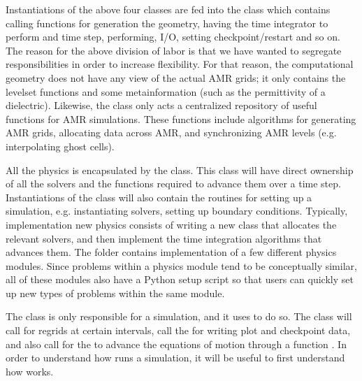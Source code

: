 \documentclass[letterpaper,10pt,english]{sphinxmanual}
\begin{document}
Instantiations of the above four classes are fed into the {\hyperref[\detokenize{Driver:chap-driver}]{}} class which contains calling functions for generation the geometry, having the time integrator to perform and time step, performing, I/O, setting checkpoint/restart and so on.
The reason for the above division of labor is that we have wanted to segregate responsibilities in order to increase flexibility.
For that reason, the computational geometry does not have any view of the actual AMR grids; it only contains the level\sphinxhyphen{}set functions and some meta\sphinxhyphen{}information (such as the permittivity of a dielectric).
Likewise, the {\hyperref[\detokenize{AmrMesh:chap-amr-mesh}]{}} class only acts a centralized repository of useful functions for AMR simulations.
These functions include algorithms for generating AMR grids, allocating data across AMR, and synchronizing AMR levels (e.g. interpolating ghost cells).

All the physics is encapsulated by the {\hyperref[\detokenize{TimeStepper:chap-time-stepper}]{}} class.
This class will have direct ownership of all the solvers and the functions required to advance them over a time step.
Instantiations of the class will also contain the routines for setting up a simulation, e.g. instantiating solvers, setting up boundary conditions.
Typically, implementation new physics consists of writing a new  class that allocates the relevant solvers, and then implement the time integration algorithms that advances them.
The folder  contains implementation of a few different physics modules.
Since problems within a physics module tend to be conceptually similar, all of these modules also have a Python setup script so that users can quickly set up new types of problems within the same module.

The {\hyperref[\detokenize{Driver:chap-driver}]{}} class is only responsible for  a simulation, and it uses  to do so.
The {\hyperref[\detokenize{Driver:chap-driver}]{}} class will call for regrids at certain intervals, call the {\hyperref[\detokenize{TimeStepper:chap-time-stepper}]{}} for writing plot and checkpoint data, and also call for the {\hyperref[\detokenize{TimeStepper:chap-time-stepper}]{}} to advance the equations of motion through a function .
In order to understand how  runs a simulation, it will be useful to first understand how {\hyperref[\detokenize{Driver:chap-driver}]{}} works.
\end{document}
